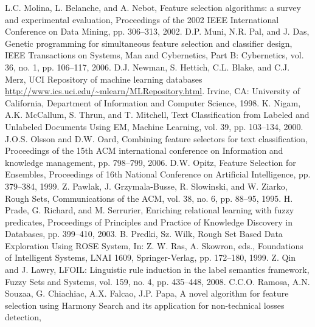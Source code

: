 L.C. Molina, L. Belanche, and A. Nebot,
Feature selection algorithms: a survey and experimental evaluation,
Proceedings of the 2002 IEEE International Conference on Data Mining,
pp. 306--313,
2002.
D.P. Muni, N.R. Pal, and J. Das,
Genetic programming for simultaneous feature selection and classifier design,
IEEE Transactions on Systems, Man and Cybernetics, Part B: Cybernetics,
vol. 36, no. 1, pp. 106--117,
2006.
D.J. Newman, S. Hettich, C.L. Blake, and C.J. Merz,
UCI Repository of machine learning databases \url{http://www.ics.uci.edu/~mlearn/MLRepository.html}. Irvine, CA:
University of California, Department of Information and Computer Science,
1998.
K. Nigam, A.K. McCallum, S. Thrun, and T. Mitchell,
Text Classification from Labeled and Unlabeled Documents Using EM,
Machine Learning,
vol. 39, pp. 103--134,
2000.
J.O.S. Olsson and D.W. Oard,
Combining feature selectors for text classification,
Proceedings of the 15th ACM international conference on Information and knowledge management,
pp. 798--799,
2006.
D.W. Opitz,
Feature Selection for Ensembles,
Proceedings of 16th National Conference on Artificial Intelligence,
pp. 379--384,
1999.
Z. Pawlak, J. Grzymala-Busse, R. Slowinski, and W. Ziarko,
Rough Sets,
Communications of the ACM,
vol. 38, no. 6, pp. 88--95,
1995.
H. Prade, G. Richard, and M. Serrurier,
Enriching relational learning with fuzzy predicates,
Proceedings of Principles and Practice of Knowledge Discovery in Databases,
pp. 399--410,
2003.
B. Predki, Sz. Wilk,
Rough Set Based Data Exploration Using ROSE System,
In: Z. W. Ras, A. Skowron, eds.,
Foundations of Intelligent Systems,
LNAI 1609, Springer-Verlag, pp. 172--180,
1999.
Z. Qin and J. Lawry,
LFOIL: Linguistic rule induction in the label semantics framework,
Fuzzy Sets and Systems,
vol. 159, no. 4, pp. 435--448,
2008.
C.C.O. Ramosa, A.N. Souzaa, G. Chiachiac, A.X. Falcao, J.P. Papa,
A novel algorithm for feature selection using Harmony Search and its application for non-technical losses detection,
